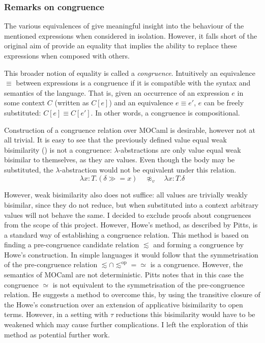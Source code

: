 \documentclass[12pt,twoside,notitlepage]{report}
\theoremstyle{plain}%
\theoremstyle{definition}
\theoremstyle{remark}
\begin{document}
\subsubsection{Remarks on congruence}

The various equivalences of  give meaningful insight into the behaviour of the mentioned expressions when considered in isolation. However, it falls short of the original aim of provide an equality that implies the ability to replace these expressions when composed with others. 

This broader notion of equality is called a \textit{congruence}. Intuitively an equivalence $ \equiv $ between expressions is a congruence if it is compatible with the syntax and semantics of the language. That is, given an occurrence of an expression $ e $ in some context $ C $ (written as $ C[e] $) and an equivalence $ e \equiv e' $, $ e $ can be freely substituted: $ C[e]\equiv C[e'] $. In other words, a congruence is compositional.

Construction of a congruence relation over MOCaml is desirable, however not at all trivial. It is easy to see that the previously defined value equal weak bisimilarity () is not a congruence: $ \lambda $-abstractions are only  value equal weak bisimilar to themselves, as they are values. Even though the body may be substituted, the $ \lambda $-abstraction would not be equivalent under this relation.
\[ \lambda x : T.( \delta \gg= x)\quad \not\approx_v \quad \lambda x : T.\delta \]

However, weak bisimilarity also does not suffice: all values are trivially weakly bisimilar, since they do not reduce, but when substituted into a context arbitrary values will not behave the same. I decided to exclude proofs about congruences from the scope of this project. However, Howe's method\cite{howe1996proving}, as described by Pitts\cite{pitts2011howe}, is a standard way of establishing a congruence relation. This method is based on finding a pre-congruence candidate relation $ \lesssim $ and forming a congruence by Howe's construction. In simple languages it would follow that the symmetrisation of the pre-congruence relation  $ \lesssim \cap \lesssim^{\text{op}} = \simeq $ is a congruence. However, the semantics of MOCaml are not deterministic. Pitts notes that in this case the congruence $  \simeq$ is not equivalent to the symmetrisation of the pre-congruence relation. He suggests a method to overcome this, by using the transitive closure of the Howe's construction over an extension of applicative bisimilarity to open terms. However, in a setting with $ \tau $ reductions this bisimilarity would have to be weakened which may cause further complications. I left the exploration of this method as potential further work.
\end{document}
